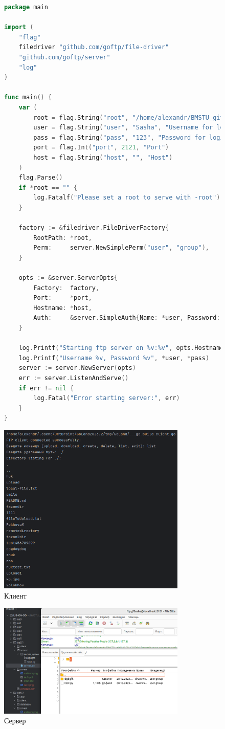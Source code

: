 \documentclass[a4paper, 14pt]{extarticle}
\begin{document}
\newpage
\begin{figure}[!htb]
\begin{lstlisting}[language={Go},caption={server.go},label={lst:code3}]
package main

import (
	"flag"
	filedriver "github.com/goftp/file-driver"
	"github.com/goftp/server"
	"log"
)

func main() {
	var (
		root = flag.String("root", "/home/alexandr/BMSTU_git/IU9-CN-GO/lab6.1/server/server_space", "Root directory to serve")
		user = flag.String("user", "Sasha", "Username for login")
		pass = flag.String("pass", "123", "Password for login")
		port = flag.Int("port", 2121, "Port")
		host = flag.String("host", "", "Host")
	)
	flag.Parse()
	if *root == "" {
		log.Fatalf("Please set a root to serve with -root")
	}

	factory := &filedriver.FileDriverFactory{
		RootPath: *root,
		Perm:     server.NewSimplePerm("user", "group"),
	}

	opts := &server.ServerOpts{
		Factory:  factory,
		Port:     *port,
		Hostname: *host,
		Auth:     &server.SimpleAuth{Name: *user, Password: *pass},
	}

	log.Printf("Starting ftp server on %v:%v", opts.Hostname, opts.Port)
	log.Printf("Username %v, Password %v", *user, *pass)
	server := server.NewServer(opts)
	err := server.ListenAndServe()
	if err != nil {
		log.Fatal("Error starting server:", err)
	}
}

\end{lstlisting}
\end{figure}

\newpage

\begin{figure}[!htb]
	\centering
	\includegraphics[width=0.8\textwidth]{res1.png}
\caption{Клиент}
\label{fig:img1}
\end{figure}

\begin{figure}[!htb]
	\centering
	\includegraphics[width=0.8\textwidth]{res2.png}
\caption{Сервер}
\label{fig:img2}
\end{figure}
\end{document}
